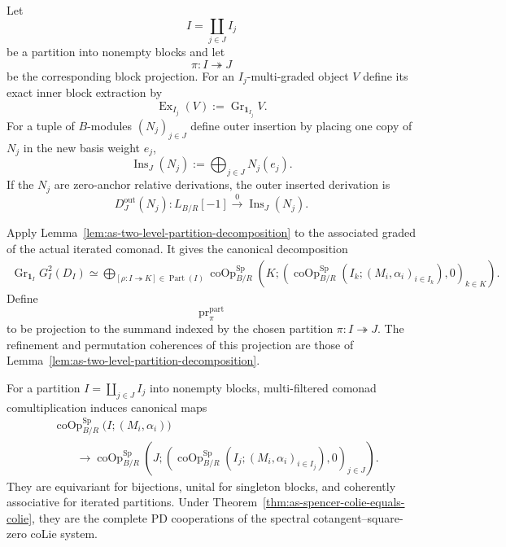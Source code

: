 \begin{construction}
\label{con:as-block-regrading}
Let
\[
    I=\coprod_{j\in J}I_j
\]
be a partition into nonempty blocks and let
\[
    \pi:I\twoheadrightarrow J
\]
be the corresponding block projection.  For an $I_j$-multi-graded object $V$
define its exact inner block extraction by
\[
\boxed{
    \operatorname{Ex}_{I_j}(V)
    :=
    \operatorname{Gr}_{\mathbf1_{I_j}}V.
}
\]
For a tuple of $B$-modules $(N_j)_{j\in J}$ define outer insertion by placing
one copy of $N_j$ in the new basis weight $e_j$,
\[
\boxed{
    \operatorname{Ins}_{J}(N_j)
    :=
    \bigoplus_{j\in J}N_j(e_j).
}
\]
If the $N_j$ are zero-anchor relative derivations, the outer inserted
derivation is
\[
    D^{\mathrm{out}}_J(N_j):
    L_{B/R}[-1]
    \xrightarrow{0}
    \operatorname{Ins}_{J}(N_j).
\]

Apply Lemma~\ref{lem:as-two-level-partition-decomposition} to the associated
graded of the actual iterated comonad.  It gives the canonical decomposition
\[
\boxed{
\begin{aligned}
    \operatorname{Gr}_{\mathbf1_I}G_I^2(D_I)
    \simeq
    \bigoplus_{[\rho:I\twoheadrightarrow K]\in\operatorname{Part}(I)}
    \operatorname{coOp}^{\mathrm{Sp}}_{B/R}
    \left(
        K;
        \left(
            \operatorname{coOp}^{\mathrm{Sp}}_{B/R}
            (I_k;(M_i,\alpha_i)_{i\in I_k}),0
        \right)_{k\in K}
    \right).
\end{aligned}}
\]
Define
\[
\boxed{
    \operatorname{pr}_{\pi}^{\mathrm{part}}
}
\]
to be projection to the summand indexed by the chosen partition
$\pi:I\twoheadrightarrow J$.  The refinement and permutation coherences of
this projection are those of
Lemma~\ref{lem:as-two-level-partition-decomposition}.
\end{construction}

\begin{theorem}
\label{thm:as-multiweight-pd-substitution}
For a partition $I=\coprod_{j\in J}I_j$ into nonempty blocks, multi-filtered
comonad comultiplication induces canonical maps
\[
\boxed{
\begin{aligned}
&\operatorname{coOp}^{\mathrm{Sp}}_{B/R}
  \bigl(I;(M_i,\alpha_i)\bigr)\\
&\qquad\longrightarrow
\operatorname{coOp}^{\mathrm{Sp}}_{B/R}
  \left(
      J;
      \left(
        \operatorname{coOp}^{\mathrm{Sp}}_{B/R}
        (I_j;(M_i,\alpha_i)_{i\in I_j}),0
      \right)_{j\in J}
  \right).
\end{aligned}}
\]
They are equivariant for bijections, unital for singleton blocks, and
coherently associative for iterated partitions.  Under
Theorem~\ref{thm:as-spencer-colie-equals-colie}, they are the complete PD
cooperations of the spectral cotangent--square-zero coLie system.
\end{theorem}

